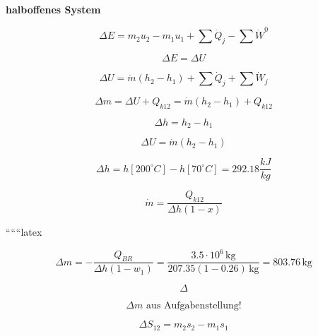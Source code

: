 \textbf{halboffenes System}

\[
\Delta E = m_2 u_2 - m_1 u_1 + \sum \dot{Q}_j - \sum \dot{W}^0
\]

\[
\Delta E = \Delta U
\]

\[
\Delta U = \dot{m} \left( h_2 - h_1 \right) + \sum \dot{Q}_j + \sum \dot{W}_j
\]

\[
\Delta m = \Delta U + Q_{k12} = \dot{m} \left( h_2 - h_1 \right) + Q_{k12}
\]

\[
\Delta h = h_2 - h_1
\]

\[
\Delta U = \dot{m} \left( h_2 - h_1 \right)
\]

\[
\Delta h = h \left[ 200^\circ C \right] - h \left[ 70^\circ C \right] = 292.18 \frac{kJ}{kg}
\]

\[
\dot{m} = \frac{Q_{k12}}{\Delta h \left( 1 - x \right)}
\]

``````latex


\[
\Delta m = -\frac{Q_{BR}}{\Delta h (1 - w_1)} = \frac{3.5 \cdot 10^6 \, \text{kg}}{207.35 (1 - 0.26) \, \text{kg}} = 803.76 \, \text{kg}
\]

\[
\Delta
\]

\[
\Delta m \text{ aus Aufgabenstellung!}
\]

\[
\Delta S_{12} = m_2 s_2 - m_1 s_1
\]

